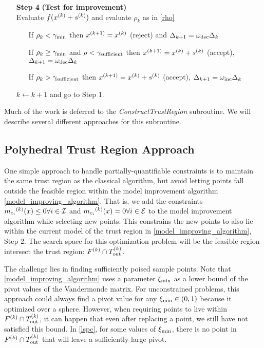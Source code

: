 \begin{algorithm}[H]
\begin{itemize}
        \item[\textbf{Step 4}] \textbf{(Test for improvement)} \\
            Evaluate $f({x^{(k)}} + {{s}^{(k)}})$ and evaluate $\rho_k$ as in \cref{rho} \begin{itemize}
                \item[] If $\rho_k < \gamma_{\text{min}}$ then ${{x}^{(k+1)}}={x^{(k)}}$ (reject) and $\Delta_{k+1} = \omega_{\text{dec}}\Delta_k$
                \item[] If $\rho_k \ge \gamma_{\text{min}}$ and $\rho < \gamma_{\text{sufficient}}$ then ${{x}^{(k+1)}}={x^{(k)}}+{{s}^{(k)}}$ (accept), $\Delta_{k+1} = \omega_{\text{dec}}\Delta_k$
                \item[] If $\rho_k > \gamma_{\text{sufficient}}$ then ${{x}^{(k+1)}}={x^{(k)}}+{{s}^{(k)}}$ (accept), $\Delta_{k+1} = \omega_{\text{inc}}\Delta_k$
            \end{itemize}
            $k \gets k+1$ and go to Step 1.
    \end{itemize}
\end{algorithm}
 

Much of the work is deferred to the \emph{ConstructTrustRegion} subroutine.
We will describe several different approaches for this subroutine.

\subsection{Polyhedral Trust Region Approach}
One simple approach to handle partially-quantifiable constraints is to maintain the same trust region as the classical algorithm, but avoid letting points fall outside the feasible region within the model improvement algorithm \cref{model_improving_algorithm}.
That is, we add the constraints ${{m}_{c_i}}^{(k)}(x) \le 0 \forall i \in \mathcal{I}$ and ${{m}_{c_i}}^{(k)}(x) = 0 \forall i \in \mathcal{E}$ to the model improvement algorithm while selecting new points.
This constrains the new points to also lie within the current model of the trust region in \cref{model_improving_algorithm}, Step 2.
The search space for this optimization problem will be the feasible region intersect the trust region: ${F}^{(k)} \cap {T_{\text{out}}^{(k)}} $.

The challenge lies in finding sufficiently poised sample points.
Note that \cref{model_improving_algorithm} uses a parameter $  \xi_{\text{min}} $ as a lower bound of the pivot values of the Vandermonde matrix.
For unconstrained problems, this approach could always find a pivot value for any $ \xi_{\text{min}} \in (0,1)$ because it optimized over a sphere.
However, when requiring points to live within $ {F}^{(k)} \cap {T_{\text{out}}^{(k)}} $, it can happen that even after replacing a point, we still have not satisfied this bound.
In \cref{lspc}, for some values of $  \xi_{\text{min}} $, there is no point in $ {F}^{(k)} \cap {T_{\text{out}}^{(k)}} $ that will leave a sufficiently large pivot.

